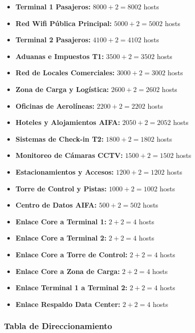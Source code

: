 \begin{itemize}[leftmargin=*]
    \item \textbf{Terminal 1 Pasajeros:} $8000 + 2 = 8002$ hosts
    \item \textbf{Red Wifi Pública Principal:} $5000 + 2 = 5002$ hosts
    \item \textbf{Terminal 2 Pasajeros:} $4100 + 2 = 4102$ hosts
    \item \textbf{Aduanas e Impuestos T1:} $3500 + 2 = 3502$ hosts
    \item \textbf{Red de Locales Comerciales:} $3000 + 2 = 3002$ hosts
    \item \textbf{Zona de Carga y Logística:} $2600 + 2 = 2602$ hosts
    \item \textbf{Oficinas de Aerolíneas:} $2200 + 2 = 2202$ hosts
    \item \textbf{Hoteles y Alojamientos AIFA:} $2050 + 2 = 2052$ hosts
    \item \textbf{Sistemas de Check-in T2:} $1800 + 2 = 1802$ hosts
    \item \textbf{Monitoreo de Cámaras CCTV:} $1500 + 2 = 1502$ hosts
    \item \textbf{Estacionamientos y Accesos:} $1200 + 2 = 1202$ hosts
    \item \textbf{Torre de Control y Pistas:} $1000 + 2 = 1002$ hosts
    \item \textbf{Centro de Datos AIFA:} $500 + 2 = 502$ hosts
    \item \textbf{Enlace Core a Terminal 1:} $2 + 2 = 4$ hosts
    \item \textbf{Enlace Core a Terminal 2:} $2 + 2 = 4$ hosts
    \item \textbf{Enlace Core a Torre de Control:} $2 + 2 = 4$ hosts
    \item \textbf{Enlace Core a Zona de Carga:} $2 + 2 = 4$ hosts
    \item \textbf{Enlace Terminal 1 a Terminal 2:} $2 + 2 = 4$ hosts
    \item \textbf{Enlace Respaldo Data Center:} $2 + 2 = 4$ hosts
\end{itemize}

\subsubsection*{Tabla de Direccionamiento}

